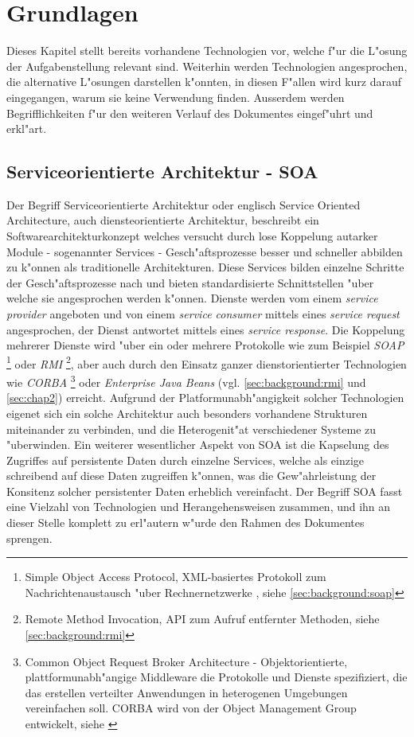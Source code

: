 \chapter{Grundlagen}
\label{sec:background}

Dieses Kapitel stellt bereits vorhandene Technologien vor, welche f"ur die L"osung der Aufgabenstellung relevant sind.
Weiterhin werden Technologien angesprochen, die alternative L"osungen darstellen k"onnten, in diesen F"allen wird kurz
darauf eingegangen, warum sie keine Verwendung finden. Ausserdem werden Begrifflichkeiten f"ur den weiteren Verlauf
des Dokumentes eingef"uhrt und erkl"art.

\section{Serviceorientierte Architektur - SOA}
\label{sec:background:soa}
Der Begriff Serviceorientierte Architektur oder englisch Service Oriented Architecture, auch diensteorientierte Architektur,
beschreibt ein Softwarearchitekturkonzept welches versucht durch lose Koppelung autarker Module - sogenannter Services -
Gesch"aftsprozesse besser und schneller abbilden zu k"onnen als traditionelle Architekturen. Diese Services bilden
einzelne Schritte der Gesch"aftsprozesse nach und bieten standardisierte Schnittstellen "uber welche sie angesprochen
werden k"onnen. Dienste werden vom einem \emph{service provider} angeboten und von einem \emph{service consumer}
mittels eines \emph{service request} angesprochen, der Dienst antwortet mittels eines \emph{service response}.
Die Koppelung mehrerer Dienste wird "uber ein oder mehrere Protokolle wie zum Beispiel \emph{SOAP}
\footnote{Simple Object Access Protocol, XML-basiertes Protokoll zum Nachrichtenaustausch "uber Rechnernetzwerke , siehe \ref{sec:background:soap}}
oder \emph{RMI}
\footnote{Remote Method Invocation, API zum Aufruf entfernter Methoden, siehe \ref{sec:background:rmi}}, 
aber auch durch den Einsatz ganzer dienstorientierter Technologien
wie \emph{CORBA} \footnote{
Common Object Request Broker Architecture - Objektorientierte, plattformunabh"angige Middleware die Protokolle und Dienste
spezifiziert, die das erstellen verteilter Anwendungen in heterogenen Umgebungen vereinfachen soll. CORBA wird von
der Object Management Group entwickelt, siehe \cite{OMGHP}}
oder \emph{Enterprise Java Beans} (vgl. \ref{sec:background:rmi} und \ref{sec:chap2}) erreicht. 
Aufgrund der Platformunabh"angigkeit solcher Technologien eigenet sich ein solche Architektur auch besonders vorhandene
Strukturen miteinander zu verbinden, und die Heterogenit"at verschiedener Systeme zu "uberwinden.
Ein weiterer wesentlicher Aspekt von SOA ist die Kapselung des Zugriffes
auf persistente Daten durch einzelne Services, welche als einzige schreibend auf diese Daten zugreiffen k"onnen, was 
die Gew"ahrleistung der Konsitenz solcher persistenter Daten erheblich vereinfacht. 
Der Begriff SOA fasst eine Vielzahl von Technologien und Herangehensweisen zusammen, und ihn an dieser Stelle komplett zu 
erl"autern w"urde den Rahmen des Dokumentes sprengen.

